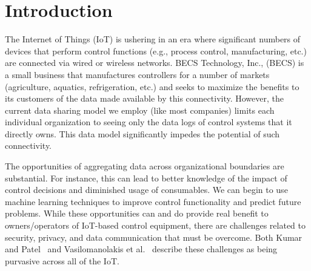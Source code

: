 \section{Introduction}
\label{sec:intro}

%


The Internet of Things (IoT) is ushering in an era where significant numbers of devices that perform control functions (e.g., process control,
manufacturing, etc.) are connected via wired or wireless networks.
BECS Technology, Inc., (BECS) is a small business that manufactures controllers for a number of markets (agriculture, aquatics, refrigeration, etc.) and seeks to maximize the benefits to its customers of the data made available by this connectivity.
However, the current data sharing model we employ (like most companies) limits
each individual organization to seeing only the data logs of control
systems that it directly owns. 
This data model significantly impedes the potential of such connectivity.

The opportunities of aggregating data across organizational boundaries are substantial.
For instance, this can lead to better knowledge of the impact of control decisions and diminished usage of consumables.
We can begin to use machine learning techniques to improve control functionality and predict future problems. 
While these opportunities can and do provide real benefit to owners/operators of IoT-based control equipment, there are challenges related to security, privacy, and data communication that must be overcome.
Both Kumar and Patel~\cite{kp14} and
Vasilomanolakis et al.~\cite{vdlgw15} describe these challenges as being
purvasive across all of the IoT.

